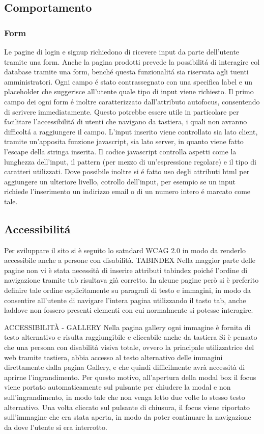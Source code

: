     \subsection{Comportamento}
		\subsubsection{Form}
		Le pagine di login e signup richiedono di ricevere input da parte dell'utente tramite una form.
		Anche la pagina prodotti prevede la possibilit\'a di interagire col database tramite una form, bench\'e questa funzionalit\'a sia riservata agli tuenti amministratori.
		Ogni campo \'e stato contrassegnato con una specifica label e un placeholder che suggerisce all'utente quale tipo di input viene richiesto.
		Il primo campo dei ogni form \'e inoltre caratterizzato dall'attributo autofocus, consentendo di scrivere immediatamente.
		Questo potrebbe essere utile in particolare per facilitare l'accessibilit\'a di utenti che navigano da tastiera, i quali non avranno difficolt\'a  a raggiungere il campo.
		L'input inserito viene controllato sia lato client, tramite un'apposita funzione javascript, sia lato server, in quanto viene fatto l'escape della stringa inserita.
		Il codice javascript controlla aspetti come la lunghezza dell'input, il pattern (per mezzo di un'espressione regolare) e il tipo di caratteri utilizzati.
		Dove possibile inoltre si \'e fatto uso degli attributi html per aggiungere un ulteriore livello, cotrollo dell'input, per esempio se un input richiede l'inserimento un indirizzo email o di un numero intero \'e marcato come tale.

	\subsection{Accessibilit\'a}
		Per sviluppare il sito si è seguito lo satndard WCAG 2.0 in modo da renderlo accessibile anche a persone con disabilità.
		TABINDEX
		Nella maggior parte delle pagine non vi è stata necessità di inserire attributi tabindex poiché l'ordine di navigazione tramite tab risultava già corretto.
		In alcune pagine però si è preferito definire tale ordine esplicitamente su paragrafi di testo e immagini, in modo da consentire all'utente di navigare l'intera pagina utilizzando il tasto tab, anche laddove non fossero presenti elementi con cui normalmente si potesse interagire.

		ACCESSIBILITÀ - GALLERY
		Nella pagina gallery ogni immagine è fornita di testo alternativo e risulta raggiungibile e cliccabile anche da tastiera
		Si è pensato che una persona con disabilità visiva totale, ovvero la principale utilizzatrice del web tramite tastiera, abbia accesso al testo alternativo delle immagini direttamente dalla pagina Gallery, e che quindi difficilmente avrà necessità di aprirne l'ingrandimento.
		Per questo motivo, all'apertura della modal box il focus viene portato automaticamente sul pulsante per chiudere la modal e non sull'ingrandimento, in modo tale che non venga letto due volte lo stesso testo alternativo.
		Una volta cliccato sul pulsante di chiusura, il focus viene riportato sull'immagine che era stata aperta, in modo da poter continuare la navigazione da dove l'utente si era interrotto. 
